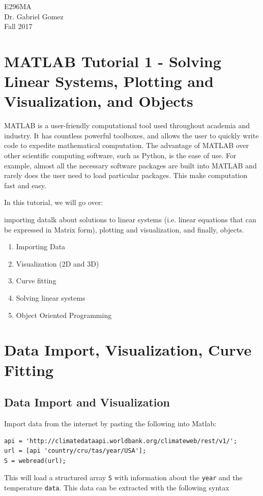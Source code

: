 \documentclass[12pt]{article}
\begin{document}
\noindent E296MA\\ Dr. Gabriel Gomez \\ Fall 2017

\section*{MATLAB Tutorial 1 - Solving Linear Systems, Plotting and Visualization, and Objects}
MATLAB is a user-friendly computational tool used throughout academia and industry. It has countless powerful toolboxes, and allows the user to quickly write code to expedite mathematical computation. The advantage of MATLAB over other scientific computing software, such as Python, is the ease of use. For example, almost all the necessary software packages are built into MATLAB and rarely does the user need to load particular packages. This make computation fast and easy.

In this tutorial, we will go over: 

importing datalk about solutions to linear systems (i.e. linear equations that can be expressed in Matrix form), plotting and visualization, and finally, objects. 

\begin{enumerate}
\item Importing Data
\item Visualization (2D and 3D)
\item Curve fitting
\item Solving linear systems
\item Object Oriented Programming
\end{enumerate}

\section{Data Import, Visualization, Curve Fitting}

\subsection{Data Import and Visualization}
Import data from the internet by pasting the following into Matlab:

\begin{lstlisting}[frame=single]
api = 'http://climatedataapi.worldbank.org/climateweb/rest/v1/';
url = [api 'country/cru/tas/year/USA'];
S = webread(url);
\end{lstlisting}

This will load a structured array \lstinline|S| with information about the \lstinline|year| and the temperature \lstinline|data|. This data can be extracted with the following syntax
\end{document}
